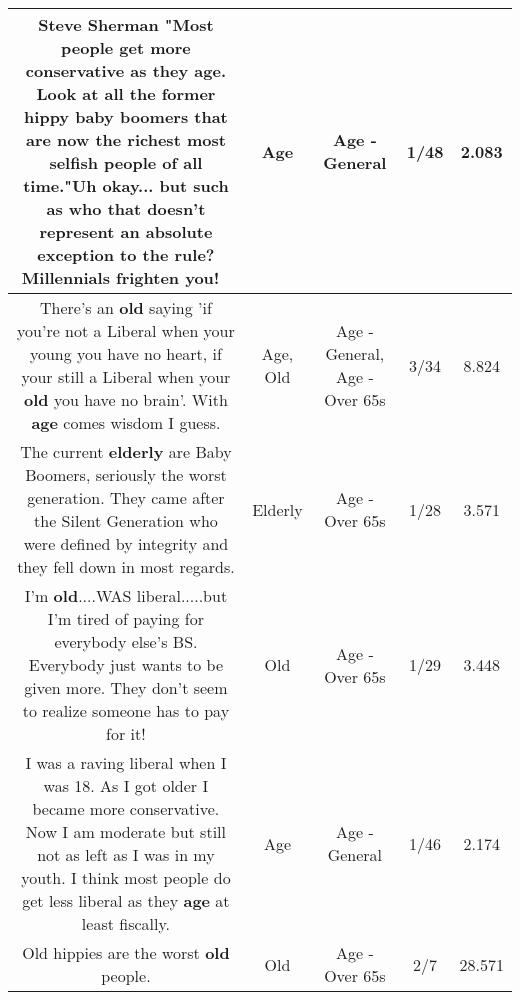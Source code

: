 \documentclass[11pt]{article}
\newlength\mylength
\begin{document}
\begin{center}
\begin{longtable}{|C{.65\mylength}|C{.30\mylength}|C{.12\mylength}|C{.12\mylength}|C{.12\mylength}|}
  \small Steve Sherman "Most people get more conservative as they \textbf{age}. Look at all the former hippy baby boomers that are now the richest most selfish people of all time."Uh okay... but such as who that doesn't represent an absolute exception to the rule? Millennials frighten you! 🤣\normalsize   & Age & Age - General & 1/48 & 2.083 \\  \hline
  \small There's an \textbf{old} saying 'if you're not a Liberal when your young you have no heart, if your still a Liberal when your \textbf{old} you have no brain'. With \textbf{age} comes wisdom I guess.\normalsize   & Age, Old & Age - General, Age - Over 65s & 3/34 & 8.824 \\  \hline
  \small The current \textbf{elderly} are Baby Boomers, seriously the worst generation. They came after the Silent Generation who were defined by integrity and they fell down in most regards.\normalsize   & Elderly & Age - Over 65s & 1/28 & 3.571 \\  \hline
  \small I'm \textbf{old}....WAS liberal.....but I'm tired of paying for everybody else's BS. Everybody just wants to be given more. They don't seem to realize someone has to pay for it!\normalsize   & Old & Age - Over 65s & 1/29 & 3.448 \\  \hline
  \small I was a raving liberal when I was 18. As I got older I became more conservative. Now I am moderate but still not as left as I was in my youth. I think most people do get less liberal as they \textbf{age} at least fiscally.\normalsize   & Age & Age - General & 1/46 & 2.174 \\  \hline
  \small Old hippies are the worst \textbf{old} people.\normalsize   & Old & Age - Over 65s & 2/7 & 28.571 \\  \hline

\end{longtable}
\end{center}
\end{document}
